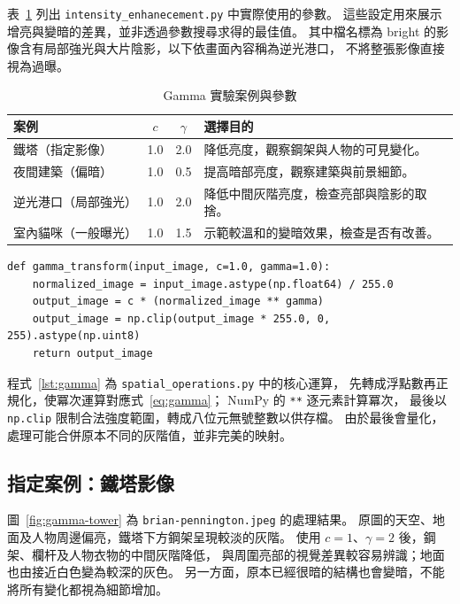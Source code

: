 表~\ref{tab:gamma-parameters} 列出
\texttt{intensity\_enhanecement.py} 中實際使用的參數。
這些設定用來展示增亮與變暗的差異，並非透過參數搜尋求得的最佳值。
其中檔名標為 bright 的影像含有局部強光與大片陰影，以下依畫面內容稱為逆光港口，
不將整張影像直接視為過曝。

\begin{table}[H]
  \centering
  \caption{Gamma 實驗案例與參數}
  \label{tab:gamma-parameters}
  \begin{tabularx}{\textwidth}{@{}lccX@{}}
    \toprule
    案例 & $c$ & $\gamma$ & 選擇目的 \\
    \midrule
    鐵塔（指定影像） & 1.0 & 2.0 & 降低亮度，觀察鋼架與人物的可見變化。 \\
    夜間建築（偏暗） & 1.0 & 0.5 & 提高暗部亮度，觀察建築與前景細節。 \\
    逆光港口（局部強光） & 1.0 & 2.0 & 降低中間灰階亮度，檢查亮部與陰影的取捨。 \\
    室內貓咪（一般曝光） & 1.0 & 1.5 & 示範較溫和的變暗效果，檢查是否有改善。 \\
    \bottomrule
  \end{tabularx}
\end{table}

\begin{lstlisting}[caption={Gamma 轉換的核心實作},label={lst:gamma}]
def gamma_transform(input_image, c=1.0, gamma=1.0):
    normalized_image = input_image.astype(np.float64) / 255.0
    output_image = c * (normalized_image ** gamma)
    output_image = np.clip(output_image * 255.0, 0, 255).astype(np.uint8)
    return output_image
\end{lstlisting}

程式~\ref{lst:gamma} 為 \texttt{spatial\_operations.py} 中的核心運算，
先轉成浮點數再正規化，使冪次運算對應式~\eqref{eq:gamma}；
NumPy 的 \texttt{**} 逐元素計算冪次，
最後以 \texttt{np.clip} 限制合法強度範圍，轉成八位元無號整數以供存檔。
由於最後會量化，處理可能合併原本不同的灰階值，並非完美的映射。

\subsection{指定案例：鐵塔影像}

圖~\ref{fig:gamma-tower} 為
\texttt{brian-pennington.jpeg} 的處理結果。
原圖的天空、地面及人物周邊偏亮，鐵塔下方鋼架呈現較淡的灰階。
使用 $c=1$、$\gamma=2$ 後，鋼架、欄杆及人物衣物的中間灰階降低，
與周圍亮部的視覺差異較容易辨識；地面也由接近白色變為較深的灰色。
另一方面，原本已經很暗的結構也會變暗，不能將所有變化都視為細節增加。

